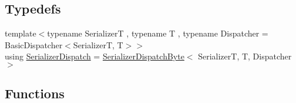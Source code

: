 \subsection*{Typedefs}
\begin{DoxyCompactItemize}
\item 
{\footnotesize template$<$typename SerializerT , typename T , typename Dispatcher  = Basic\+Dispatcher$<$\+Serializer\+T, T$>$$>$ }\\using \hyperlink{namespacecheckpoint_1_1dispatch_ae3a710db2b07fd1322ab9e6b3bbf45b4}{Serializer\+Dispatch} = \hyperlink{structcheckpoint_1_1dispatch_1_1_serializer_dispatch_byte}{Serializer\+Dispatch\+Byte}$<$ SerializerT, T, Dispatcher $>$
\end{DoxyCompactItemize}
\subsection*{Functions}
